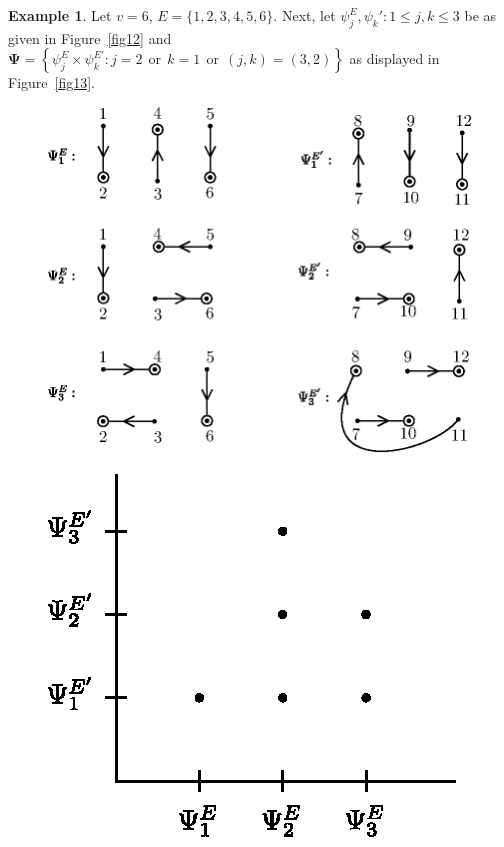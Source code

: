 \documentclass[a4paper,12pt]{article}
\theoremstyle{definition}
\theoremstyle{underlinethm}
\newtheorem{example}{Example}[section]
\theoremstyle{definition}
\begin{document}
\begin{example}\label{example-3.4}
Let $v=6$, $E = \{1,2,3,4,5,6\}$. Next, let $\psi_{j}^{E}, \psi_{k}' : 1 \leq j, k\leq 3$ be as given in Figure~\eqref{fig12} and $\boldsymbol{\Psi} = \left\{\psi_{j}^{E} \times \psi_{k}^{E'} : j=2~~\text{or}~~ k=1~~\text{or}~~(j,k)=(3,2)\right\}$ as displayed in Figure~\eqref{fig13}.
\end{example}

\newpage

\begin{figure}[h]
\centering
\includegraphics[scale=1]{figure/figures/fig12.eps}
\caption{}\label{fig12}
\end{figure}
\begin{figure}[h]
\centering
\includegraphics[scale=.9]{figure/figures/fig13.eps}
\caption{}\label{fig13}
\end{figure}
\end{document}
